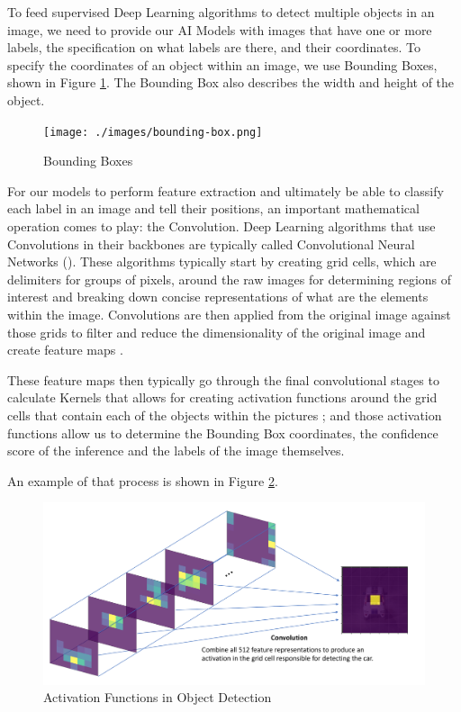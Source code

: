 \documentclass[openright]{normas-utf-tex} %
\begin{document}
To feed supervised Deep Learning algorithms to detect multiple objects in an
image, we need to provide our AI Models with images that have one or more
labels, the specification on what labels are there, and their coordinates. To
specify the coordinates of an object within an image, we use Bounding Boxes,
shown in Figure \ref{fig:boundingBoxes}. The Bounding Box also describes the
width and height of the object.

\begin{figure}[H]
	\centering
	\texttt{[image: ./images/bounding-box.png]}
	\caption[Bounding Boxes]{Bounding Boxes}
	\label{fig:boundingBoxes}
\end{figure}

For our models to perform feature extraction and ultimately be able to classify
each label in an image and tell their positions, an important mathematical
operation comes to play: the Convolution. Deep Learning algorithms that use
Convolutions in their backbones are typically called Convolutional Neural
Networks (). These algorithms
typically start by creating grid cells, which are delimiters for groups of
pixels, around the raw images for determining regions of interest and breaking
down concise representations of what are the elements within the image.
Convolutions are then applied from the original image against those grids to
filter and reduce the dimensionality of the original image and create feature
maps \cite{ObjectDetectionDeepLearning}. 

These feature maps then typically go through the final convolutional stages to
calculate Kernels that allows for creating activation functions around the grid
cells that contain each of the objects within the pictures \cite{JeremyJordan};
and those activation functions allow us to determine the Bounding Box
coordinates, the confidence score of the inference and the labels of the image
themselves. 

An example of that process is shown in Figure \ref{fig:convolutionActivation}.

\begin{figure}[H]
	\centering
	\includegraphics[width=1\textwidth]{./images/convolution-activation.png}
	\caption[Activation Functions in Object Detection]{Activation Functions in Object Detection}
	\label{fig:convolutionActivation}
\end{figure}
\end{document}
